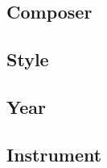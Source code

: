 \documentclass[a4paper,12pt]{article}
\begin{document}
\subsection{Composer}

\subsection{Style}

\subsection{Year}

\subsection{Instrument}


\end{document}
